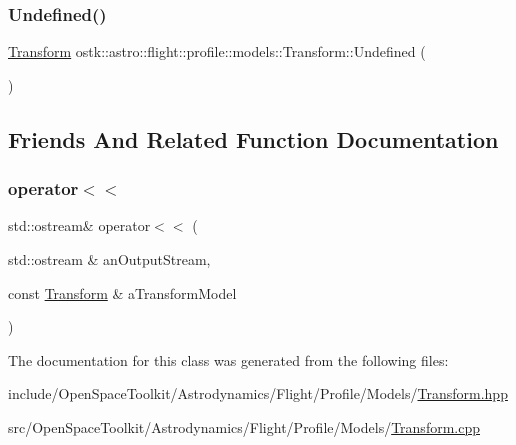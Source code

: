 \subsubsection{\texorpdfstring{Undefined()}{Undefined()}}
{\footnotesize\ttfamily \hyperlink{classostk_1_1astro_1_1flight_1_1profile_1_1models_1_1_transform}{Transform} ostk\+::astro\+::flight\+::profile\+::models\+::\+Transform\+::\+Undefined (\begin{DoxyParamCaption}{ }\end{DoxyParamCaption})\hspace{0.3cm}{\ttfamily [static]}}



\subsection{Friends And Related Function Documentation}
\mbox{\label{classostk_1_1astro_1_1flight_1_1profile_1_1models_1_1_transform_a31ed56d1b0b19d8f7363743664717403}} 
\subsubsection{\texorpdfstring{operator$<$$<$}{operator<<}}
{\footnotesize\ttfamily std\+::ostream\& operator$<$$<$ (\begin{DoxyParamCaption}\item[{std\+::ostream \&}]{an\+Output\+Stream,  }\item[{const \hyperlink{classostk_1_1astro_1_1flight_1_1profile_1_1models_1_1_transform}{Transform} \&}]{a\+Transform\+Model }\end{DoxyParamCaption})\hspace{0.3cm}{\ttfamily [friend]}}



The documentation for this class was generated from the following files\+:\begin{DoxyCompactItemize}
\item 
include/\+Open\+Space\+Toolkit/\+Astrodynamics/\+Flight/\+Profile/\+Models/\hyperlink{_transform_8hpp}{Transform.\+hpp}\item 
src/\+Open\+Space\+Toolkit/\+Astrodynamics/\+Flight/\+Profile/\+Models/\hyperlink{_transform_8cpp}{Transform.\+cpp}\end{DoxyCompactItemize}
